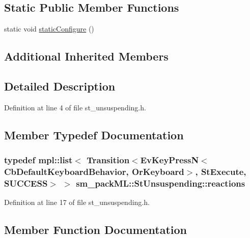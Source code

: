 \subsection*{Static Public Member Functions}
\begin{DoxyCompactItemize}
\item 
static void \hyperlink{structsm__packML_1_1StUnsuspending_a1d0786e13bbfe99d470bed2ff98874ec}{static\+Configure} ()
\end{DoxyCompactItemize}
\subsection*{Additional Inherited Members}


\subsection{Detailed Description}


Definition at line 4 of file st\+\_\+unsuspending.\+h.



\subsection{Member Typedef Documentation}
\subsubsection[{\texorpdfstring{reactions}{reactions}}]{\setlength{\rightskip}{0pt plus 5cm}typedef mpl\+::list$<$ Transition$<$Ev\+Key\+PressN$<$Cb\+Default\+Keyboard\+Behavior, {\bf Or\+Keyboard}$>$, {\bf St\+Execute}, {\bf S\+U\+C\+C\+E\+SS}$>$ $>$ {\bf sm\+\_\+pack\+M\+L\+::\+St\+Unsuspending\+::reactions}}\hypertarget{structsm__packML_1_1StUnsuspending_aee6c7c57b9289d53b71b22234277eed3}{}\label{structsm__packML_1_1StUnsuspending_aee6c7c57b9289d53b71b22234277eed3}


Definition at line 17 of file st\+\_\+unsuspending.\+h.



\subsection{Member Function Documentation}
